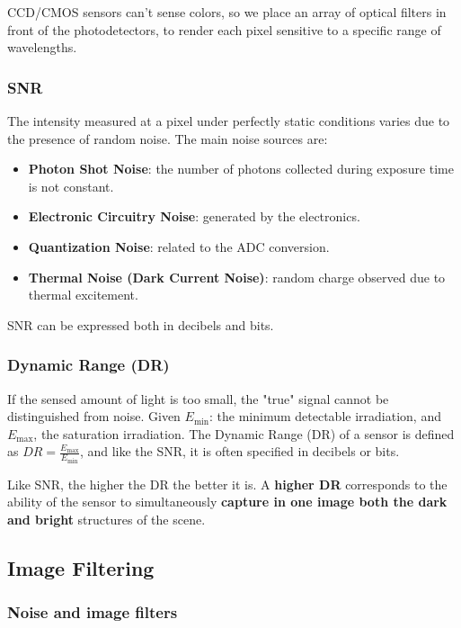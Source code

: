 CCD/CMOS sensors can't sense colors, so we place an array of optical filters in front of the photodetectors, to render each pixel sensitive to a specific range of wavelengths.

\subsubsection{SNR}

The intensity measured at a pixel under perfectly static conditions varies due to the presence of random noise.
The main noise sources are:
\begin{itemize}
  \item \textbf{Photon Shot Noise}: the number of photons collected during exposure time is not constant.
  \item \textbf{Electronic Circuitry Noise}: generated by the electronics.
  \item \textbf{Quantization Noise}: related to the ADC conversion.
  \item \textbf{Thermal Noise (Dark Current Noise)}: random charge observed due to thermal excitement.
\end{itemize}

SNR can be expressed both in decibels and bits.

\subsubsection{Dynamic Range (DR)}
If the sensed amount of light is too small, the "true" signal cannot be distinguished from noise.
Given $E_{\text{min}}$: the minimum detectable irradiation, and $E_{\text{max}}$, the saturation irradiation.
The Dynamic Range (DR) of a sensor is defined as $DR = \frac{E_{\text{max}}}{E_{\text{min}}}$, and like the SNR, it is often specified in decibels or bits.

Like SNR, the higher the DR the better it is.
A \textbf{higher DR} corresponds to the ability of the sensor to simultaneously \textbf{capture in one image both the dark and bright} structures of the scene.

\subsection{Image Filtering}

\subsubsection{Noise and image filters}

